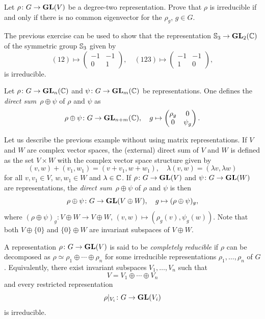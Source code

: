 \begin{exercise}
\label{xca:common_eigenvector}
    Let $\rho\colon G\to\mathbf{GL}(V)$ be a degree-two representation. Prove that
    $\rho$ is irreducible if and only if there is no common eigenvector for the
    $\rho_g$, $g\in G$.
\end{exercise}

The previous exercise can be used to show that the representation
$\mathbb{S}_3\to\mathbf{GL}_2(\mathbb{C})$
of the symmetric group $\mathbb{S}_3$
given by
\[
(12)\mapsto\begin{pmatrix}
-1&-1\\0&1
\end{pmatrix},
\quad
(123)\mapsto\begin{pmatrix}
-1&-1\\
1&0
\end{pmatrix},
\]
is irreducible.

\begin{example}
\label{exa:direct_sum_reps}
Let $\rho\colon G\to\mathbf{GL}_n(\mathbb{C})$ and $\psi\colon G\to\mathbf{GL}_m(\mathbb{C})$ be representations. One defines
the \emph{direct sum} $\rho\oplus\psi$ of $\rho$ and $\psi$ as 
\[
\rho\oplus\psi\colon G\to\mathbf{GL}_{n+m}(\mathbb{C}),\quad
g\mapsto 
\begin{pmatrix}
\rho_g & 0\\
0 & \psi_g	
\end{pmatrix}.
\]
\end{example}

Let us describe the previous example without using matrix representations. If $V$ and 
$W$ are complex vector spaces, the (external) direct sum of $V$ and $W$ is defined
as the set $V\times W$ with the complex vector space structure given by
\[
(v,w)+(v_1,w_1)=(v+v_1,w+w_1),\quad
\lambda (v,w)=(\lambda v,\lambda w)
\]
for all $v,v_1\in V$, $w,w_1\in W$ and $\lambda\in\mathbb{C}$. 
If $\rho\colon G\to\mathbf{GL}(V)$ and $\psi\colon G\to\mathbf{GL}(W)$ are representations, 
the \emph{direct sum} $\rho\oplus\psi$ of $\rho$ and $\psi$ is then 
\[
\rho\oplus\psi\colon G\to\mathbf{GL}(V\oplus W),\quad
g\mapsto (\rho\oplus\psi)_g,
\]
where $(\rho\oplus\psi)_g\colon V\oplus W\to V\oplus W$, $(v,w)\mapsto
(\rho_g(v),\psi_g(w))$. Note that both $V\oplus\{0\}$ and $\{0\}\oplus W$ are
invariant subspaces of $V\oplus W$. 

\begin{definition}
    A representation $\rho\colon G\to\mathbf{GL}(V)$ is said to be 
    \emph{completely reducible}
    if $\rho$ can be decomposed as
    $\rho\simeq\rho_1\oplus\cdots\oplus \rho_n$ for some irreducible
    representations $\rho_1,\dots,\rho_n$ of $G$.
Equivalently, 
there exist invariant subspaces $V_1,\dots,V_n$ such that
\[
V=V_1\oplus\cdots\oplus V_n
\]
and every restricted representation
\[
\rho|_{V_i}\colon G\to\mathbf{GL}(V_i)
\]
is irreducible.
\end{definition}

